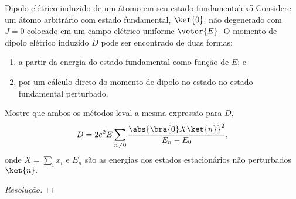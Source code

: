 \begin{exercício}{Dipolo elétrico induzido de um átomo em seu estado fundamental}{ex5}
   Considere um átomo arbitrário com estado fundamental, \(\ket{0},\) não degenerado com \(J = 0\) colocado em um campo elétrico uniforme \(\vetor{E}.\) O momento de dipolo elétrico induzido \(D\) pode ser encontrado de duas formas: 
   \begin{enumerate}[label=(\alph*)]
       \item a partir da energia do estado fundamental como função de \(E\); e
       \item por um cálculo direto do momento de dipolo no estado no estado fundamental perturbado.
   \end{enumerate}
   Mostre que ambos os métodos leval a mesma expressão para \(D,\)
   \begin{equation*}
      D = 2e^2 E \sum_{n \neq 0} \frac{\abs{\bra{0}X\ket{n}}^2}{E_n - E_0},
   \end{equation*}
   onde \(X = \sum_i x_i\) e \(E_n\) são as energias dos estados estacionários não perturbados \(\ket{n}.\)
\end{exercício}
\begin{proof}[Resolução]
    
\end{proof}
